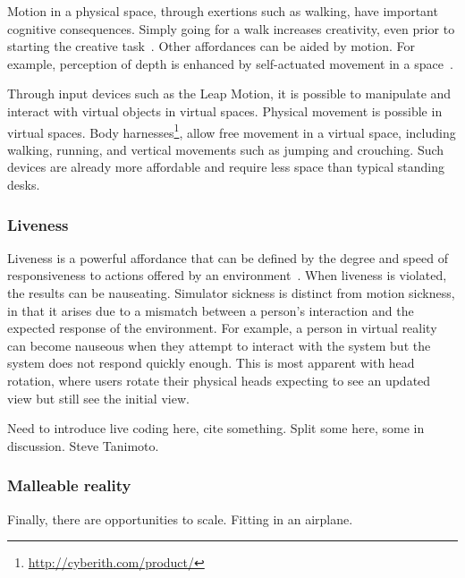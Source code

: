 \documentclass[conference]{IEEEtran}
\begin{document}
Motion in a physical space, through exertions such as walking, have important cognitive consequences.
Simply going for a walk increases creativity, even prior to starting the creative task~\cite{Oppezzo:2014}.
Other affordances can be aided by motion. For example, perception of depth is enhanced by self-actuated movement in a space~\cite{Held:1963}.

Through input devices such as the Leap Motion, it is possible to manipulate and interact with virtual objects in virtual spaces.
Physical movement is possible in virtual spaces.  Body harnesses\footnote{\url{http://cyberith.com/product/}}, allow free movement in a virtual space, including walking, running, and vertical movements such as jumping and crouching.  Such devices are already more affordable and require less space than typical standing desks.



\subsubsection{Liveness}

Liveness is a powerful affordance that can be defined by the degree and speed of responsiveness to actions offered by an environment~\cite{Tanimoto:Liveness}.
When liveness is violated, the results can be nauseating.
Simulator sickness is distinct from motion sickness, in that it arises due to a mismatch between a person's interaction and the expected response of the environment.
For example, a person in virtual reality can become nauseous when they attempt to interact with the system but the system does not respond quickly enough.
This is most apparent with head rotation, where users rotate their physical heads expecting to see an updated view but still see the initial view.

Need to introduce live coding here, cite something.  Split some here, some in discussion.
Steve Tanimoto.

\subsubsection{Malleable reality}

Finally, there are opportunities to scale.
Fitting in an airplane.
\end{document}
